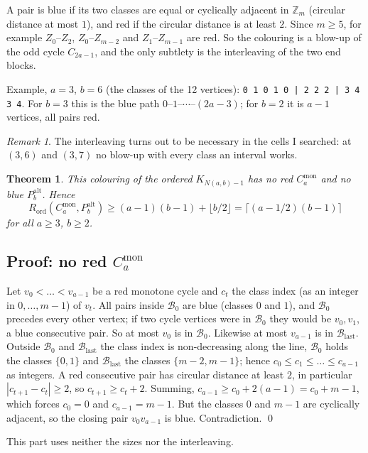 \documentclass[11pt]{article}
\newcommand{\Rord}{R_{\mathrm{ord}}}
\newcommand{\Cmon}[1]{C_{#1}^{\mathrm{mon}}}
\newcommand{\Palt}[1]{P_{#1}^{\mathrm{alt}}}
\newcommand{\Bfirst}{\mathcal{B}_0}
\newcommand{\Blast}{\mathcal{B}_{\mathrm{last}}}
\theoremstyle{plain}
\newtheorem{theorem}{Theorem}
\theoremstyle{remark}
\newtheorem*{remark}{Remark}
\begin{document}
A pair is blue if its two classes are equal or cyclically adjacent in $\mathbb{Z}_m$ (circular distance at most
$1$), and red if the circular distance is at least $2$. Since $m \geq 5$, for example $Z_0$--$Z_2$, $Z_0$--$Z_{m-2}$
and $Z_1$--$Z_{m-1}$ are red. So the colouring is a blow-up of the odd cycle $C_{2a-1}$, and the only subtlety is
the interleaving of the two end blocks.

Example, $a = 3$, $b = 6$ (the classes of the 12 vertices): \texttt{0 1 0 1 0 | 2 2 2 | 3 4 3 4}. For $b = 3$
this is the blue path $0$--$1$--$\cdots$--$(2a-3)$; for $b = 2$ it is $a-1$ vertices, all pairs red.

\begin{remark}
The interleaving turns out to be necessary in the cells I searched: at $(3,6)$ and $(3,7)$ no blow-up with every
class an interval works.
\end{remark}

\begin{theorem}\label{thm:lower}
This colouring of the ordered $K_{N(a,b)-1}$ has no red $\Cmon{a}$ and no blue $\Palt{b}$. Hence
\[
  \Rord(\Cmon{a}, \Palt{b}) \geq (a-1)(b-1) + \lfloor b/2 \rfloor = \lceil (a - 1/2)(b-1) \rceil
\]
for all $a \geq 3$, $b \geq 2$.
\end{theorem}

\subsection{Proof: no red $\Cmon{a}$}

Let $v_0 < \dots < v_{a-1}$ be a red monotone cycle and $c_t$ the class index (as an integer in
$0, \dots, m-1$) of $v_t$. All pairs inside $\Bfirst$ are blue (classes $0$ and $1$), and $\Bfirst$ precedes
every other vertex; if two cycle vertices were in $\Bfirst$ they would be $v_0, v_1$, a blue consecutive pair. So
at most $v_0$ is in $\Bfirst$. Likewise at most $v_{a-1}$ is in $\Blast$. Outside $\Bfirst$ and $\Blast$ the
class index is non-decreasing along the line, $\Bfirst$ holds the classes $\{0, 1\}$ and $\Blast$ the classes
$\{m-2, m-1\}$; hence $c_0 \leq c_1 \leq \dots \leq c_{a-1}$ as integers. A red consecutive pair has circular
distance at least $2$, in particular $|c_{t+1} - c_t| \geq 2$, so $c_{t+1} \geq c_t + 2$. Summing,
$c_{a-1} \geq c_0 + 2(a-1) = c_0 + m - 1$, which forces $c_0 = 0$ and $c_{a-1} = m-1$. But the classes $0$ and
$m-1$ are cyclically adjacent, so the closing pair $v_0 v_{a-1}$ is blue. Contradiction. \qed

This part uses neither the sizes nor the interleaving.
\end{document}

